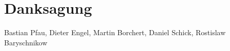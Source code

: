 \chapter*{Danksagung}
Bastian Pfau, Dieter Engel, Martin Borchert, Daniel Schick, Rostislaw Baryschnikow